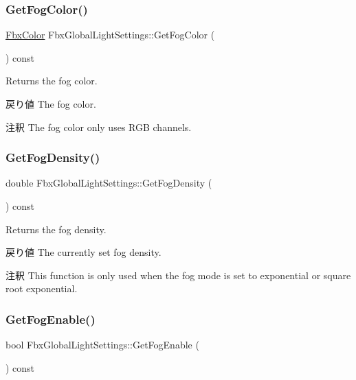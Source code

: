 \subsubsection{\texorpdfstring{Get\+Fog\+Color()}{GetFogColor()}}
{\footnotesize\ttfamily \hyperlink{class_fbx_color}{Fbx\+Color} Fbx\+Global\+Light\+Settings\+::\+Get\+Fog\+Color (\begin{DoxyParamCaption}{ }\end{DoxyParamCaption}) const}

Returns the fog color. \begin{DoxyReturn}{戻り値}
The fog color. 
\end{DoxyReturn}
\begin{DoxyRemark}{注釈}
The fog color only uses R\+GB channels. 
\end{DoxyRemark}
\mbox{\label{class_fbx_global_light_settings_ad69be94b5061ada689c5103f8b3c44c2}} 
\subsubsection{\texorpdfstring{Get\+Fog\+Density()}{GetFogDensity()}}
{\footnotesize\ttfamily double Fbx\+Global\+Light\+Settings\+::\+Get\+Fog\+Density (\begin{DoxyParamCaption}{ }\end{DoxyParamCaption}) const}

Returns the fog density. \begin{DoxyReturn}{戻り値}
The currently set fog density. 
\end{DoxyReturn}
\begin{DoxyRemark}{注釈}
This function is only used when the fog mode is set to exponential or square root exponential. 
\end{DoxyRemark}
\mbox{\label{class_fbx_global_light_settings_abceecba4b43b858168125d70c5d451ec}} 
\subsubsection{\texorpdfstring{Get\+Fog\+Enable()}{GetFogEnable()}}
{\footnotesize\ttfamily bool Fbx\+Global\+Light\+Settings\+::\+Get\+Fog\+Enable (\begin{DoxyParamCaption}{ }\end{DoxyParamCaption}) const}

